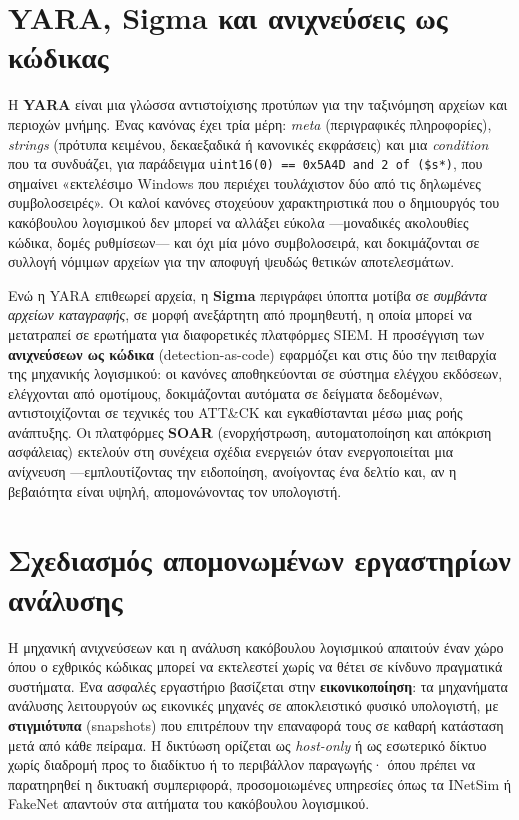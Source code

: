 \documentclass[11pt,openany]{book}
\begin{document}
\section{YARA, Sigma και ανιχνεύσεις ως κώδικας}\label{sec:11.4}
Η \textbf{YARA} είναι μια γλώσσα αντιστοίχισης προτύπων για την ταξινόμηση αρχείων και περιοχών μνήμης. Ένας κανόνας έχει τρία μέρη: \emph{meta} (περιγραφικές πληροφορίες), \emph{strings} (πρότυπα κειμένου, δεκαεξαδικά ή κανονικές εκφράσεις) και μια \emph{condition} που τα συνδυάζει, για παράδειγμα \texttt{uint16(0) == 0x5A4D and 2 of (\$s*)}, που σημαίνει «εκτελέσιμο Windows που περιέχει τουλάχιστον δύο από τις δηλωμένες συμβολοσειρές». Οι καλοί κανόνες στοχεύουν χαρακτηριστικά που ο δημιουργός του κακόβουλου λογισμικού δεν μπορεί να αλλάξει εύκολα —μοναδικές ακολουθίες κώδικα, δομές ρυθμίσεων— και όχι μία μόνο συμβολοσειρά, και δοκιμάζονται σε συλλογή νόμιμων αρχείων για την αποφυγή ψευδώς θετικών αποτελεσμάτων.

Ενώ η YARA επιθεωρεί αρχεία, η \textbf{Sigma} περιγράφει ύποπτα μοτίβα σε \emph{συμβάντα αρχείων καταγραφής}, σε μορφή ανεξάρτητη από προμηθευτή, η οποία μπορεί να μετατραπεί σε ερωτήματα για διαφορετικές πλατφόρμες SIEM. Η προσέγγιση των \textbf{ανιχνεύσεων ως κώδικα} (detection-as-code) εφαρμόζει και στις δύο την πειθαρχία της μηχανικής λογισμικού: οι κανόνες αποθηκεύονται σε σύστημα ελέγχου εκδόσεων, ελέγχονται από ομοτίμους, δοκιμάζονται αυτόματα σε δείγματα δεδομένων, αντιστοιχίζονται σε τεχνικές του ATT\&CK και εγκαθίστανται μέσω μιας ροής ανάπτυξης. Οι πλατφόρμες \textbf{SOAR} (ενορχήστρωση, αυτοματοποίηση και απόκριση ασφάλειας) εκτελούν στη συνέχεια σχέδια ενεργειών όταν ενεργοποιείται μια ανίχνευση —εμπλουτίζοντας την ειδοποίηση, ανοίγοντας ένα δελτίο και, αν η βεβαιότητα είναι υψηλή, απομονώνοντας τον υπολογιστή.

\section{Σχεδιασμός απομονωμένων εργαστηρίων ανάλυσης}\label{sec:11.5}
Η μηχανική ανιχνεύσεων και η ανάλυση κακόβουλου λογισμικού απαιτούν έναν χώρο όπου ο εχθρικός κώδικας μπορεί να εκτελεστεί χωρίς να θέτει σε κίνδυνο πραγματικά συστήματα. Ένα ασφαλές εργαστήριο βασίζεται στην \textbf{εικονικοποίηση}: τα μηχανήματα ανάλυσης λειτουργούν ως εικονικές μηχανές σε αποκλειστικό φυσικό υπολογιστή, με \textbf{στιγμιότυπα} (snapshots) που επιτρέπουν την επαναφορά τους σε καθαρή κατάσταση μετά από κάθε πείραμα. Η δικτύωση ορίζεται ως \emph{host-only} ή ως εσωτερικό δίκτυο χωρίς διαδρομή προς το διαδίκτυο ή το περιβάλλον παραγωγής· όπου πρέπει να παρατηρηθεί η δικτυακή συμπεριφορά, προσομοιωμένες υπηρεσίες όπως τα INetSim ή FakeNet απαντούν στα αιτήματα του κακόβουλου λογισμικού.
\end{document}
